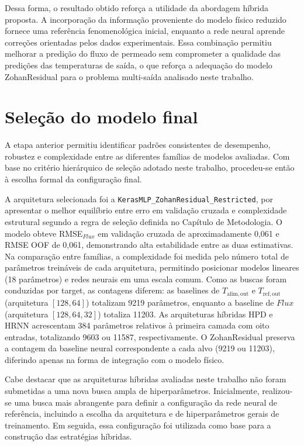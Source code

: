 Dessa forma, o resultado obtido reforça a utilidade da abordagem híbrida proposta. A incorporação da informação proveniente do modelo físico reduzido fornece uma referência fenomenológica inicial, enquanto a rede neural aprende correções orientadas pelos dados experimentais. Essa combinação permitiu melhorar a predição do fluxo de permeado sem comprometer a qualidade das predições das temperaturas de saída, o que reforça a adequação do modelo ZohanResidual para o problema multi-saída analisado neste trabalho.
\section{Seleção do modelo final}
\label{subsec:analise_modelo_selecionado}

A etapa anterior permitiu identificar padrões consistentes de desempenho, robustez e complexidade entre as diferentes famílias de modelos avaliadas. Com base no critério hierárquico de seleção adotado neste trabalho, procedeu-se então à escolha formal da configuração final.

A arquitetura selecionada foi a \texttt{KerasMLP\_ZohanResidual\_Restricted}, por apresentar o melhor equilíbrio entre erro em validação cruzada e complexidade estrutural segundo a regra de seleção definida no Capítulo de Metodologia. O modelo obteve RMSE$_{Flux}$ em validação cruzada de aproximadamente 0,061 e RMSE OOF de 0,061, demonstrando alta estabilidade entre as duas estimativas. Na comparação entre famílias, a complexidade foi medida pelo número total de parâmetros treináveis de cada arquitetura, permitindo posicionar modelos lineares (18 parâmetros) e redes neurais em uma escala comum. Como as buscas foram conduzidas por target, as contagens diferem: as baselines de \(T_{\mathrm{alim,out}}\) e \(T_{\mathrm{ref,out}}\) (arquitetura \([128,64]\)) totalizam 9219 parâmetros, enquanto a baseline de \(Flux\) (arquitetura \([128,64,32]\)) totaliza 11203. As arquiteturas híbridas HPD e HRNN acrescentam 384 parâmetros relativos à primeira camada com oito entradas, totalizando 9603 ou 11587, respectivamente. O ZohanResidual preserva a contagem da baseline neural correspondente a cada alvo (9219 ou 11203), diferindo apenas na forma de integração com o modelo físico.

Cabe destacar que as arquiteturas híbridas avaliadas neste trabalho não foram submetidas a uma nova busca ampla de hiperparâmetros. Inicialmente, realizou-se uma busca mais abrangente para definir a configuração da rede neural de referência, incluindo a escolha da arquitetura e de hiperparâmetros gerais de treinamento. Em seguida, essa configuração foi utilizada como base para a construção das estratégias híbridas.

